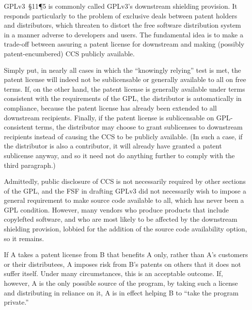 

GPLv3~\S11\P5 is commonly called GPLv3's downstream shielding provision.  It
responds particularly to the problem of exclusive deals between patent
holders and distributors, which threaten to distort the free software
distribution system in a manner adverse to developers and users.  The
fundamental idea is to make a trade-off between assuring a patent license for
downstream and making  (possibly patent-encumbered) CCS publicly available.

Simply put, in nearly all cases in which the ``knowingly relying'' test is
met, the patent license will indeed not be sublicensable or generally
available to all on free terms.  If, on the other hand, the patent license is
generally available under terms consistent with the requirements of the GPL,
the distributor is automatically in compliance, because the patent license
has already been extended to all downstream recipients.  Finally, if the
patent license is sublicensable on GPL-consistent terms, the distributor may
choose to grant sublicenses to downstream recipients instead of causing the
CCS to be publicly available.  (In such a case, if the distributor is also a
contributor, it will already have granted a patent sublicense anyway, and so
it need not do anything further to comply with the third paragraph.)

Admittedly, public disclosure of CCS is not necessarily required by other
sections of the GPL, and the FSF in drafting GPLv3 did not necessarily wish
to impose a general requirement to make source code available to all, which
has never been a GPL condition.  However, many vendors who produce products
that include copylefted software, and who are most likely to be affected by the
downstream shielding provision, lobbied for the addition of the source code
availability option, so it remains.


If A takes a patent license from B that benefits A only, rather than A’s
customers or their distributees, A imposes risk from B’s patents on others
that it does not suffer itself. Under many circumstances, this is an
acceptable outcome. If, however, A is the only possible source of the
program, by taking such a license and distributing in reliance on it, A is in
effect helping B to ``take the program private.''

